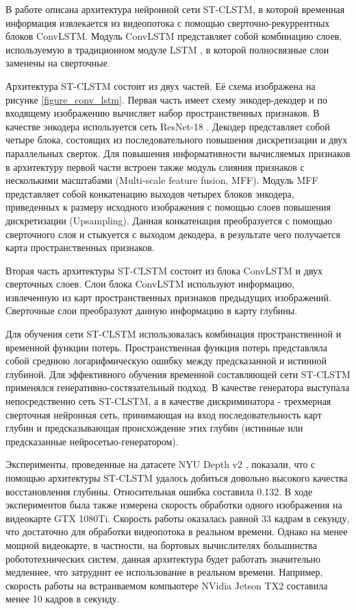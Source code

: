\documentclass{mipt-thesis-ms}
\begin{document}
	В работе \cite{zhang2019exploiting} описана архитектура нейронной сети ST-CLSTM, в которой временная информация извлекается из видеопотока с помощью сверточно-рекуррентных блоков ConvLSTM. Модуль ConvLSTM представляет собой комбинацию слоев, используемую в традиционном модуле LSTM \cite{greff2016lstm}, в которой полносвязные слои заменены на сверточные.
	
	Архитектура ST-CLSTM состоит из двух частей. Её схема изображена на рисунке \ref{figure_conv_lstm}. Первая часть имеет схему энкодер-декодер и по входящему изображению вычисляет набор пространственных признаков. В качестве энкодера используется сеть ResNet-18 \cite{he2016deep}. Декодер представляет собой четыре блока, состоящих из последовательного повышения дискретизации и двух параллельных сверток. Для повышения информативности вычисляемых признаков в архитектуру первой части встроен также модуль слияния признаков с несколькими масштабами (Multi-scale feature fusion, MFF). Модуль MFF представляет собой конкатенацию выходов четырех блоков энкодера, приведенных к размеру исходного изображения с помощью слоев повышения дискретизации (Upsampling). Данная конкатенация преобразуется с помощью сверточного слоя и стыкуется с выходом декодера, в результате чего получается карта пространственных признаков.
	
	Вторая часть архитектуры ST-CLSTM состоит из блока ConvLSTM и двух сверточных слоев. Слои блока ConvLSTM используют информацию, извлеченную из карт пространственных признаков предыдущих изображений. Сверточные слои преобразуют данную информацию в карту глубины.
	
	Для обучения сети ST-CLSTM использовалась комбинация пространственной и временной функции потерь. Пространственная функция потерь представляла собой среднюю логарифмическую ошибку между предсказанной и истинной глубиной. Для эффективного обучения временной составляющей сети ST-CLSTM применялся генеративно-состязательный подход. В качестве генератора выступала непосредственно сеть ST-CLSTM, а в качестве дискриминатора - трехмерная сверточная нейронная сеть, принимающая на вход последовательность карт глубин и предсказывающая происхождение этих глубин (истинные или предсказанные нейросетью-генератором).
	
	Эксперименты, проведенные на датасете NYU Depth v2 \cite{silberman2012indoor}, показали, что с помощью архитектуры ST-CLSTM удалось добиться довольно высокого качества восстановления глубины. Относительная ошибка составила 0.132. В ходе экспериментов была также измерена скорость обработки одного изображения на видеокарте GTX 1080Ti. Скорость работы оказалась равной 33 кадрам в секунду, что достаточно для обработки видеопотока в реальном времени. Однако на менее мощной видеокарте, в частности, на бортовых вычислителях большинства робототехнических систем, данная архитектура будет работать значительно медленнее, что затруднит ее использование в реальном времени. Например, скорость работы на встраиваемом компьютере NVidia Jetson TX2 составила менее 10 кадров в секунду.
	
\end{document}
